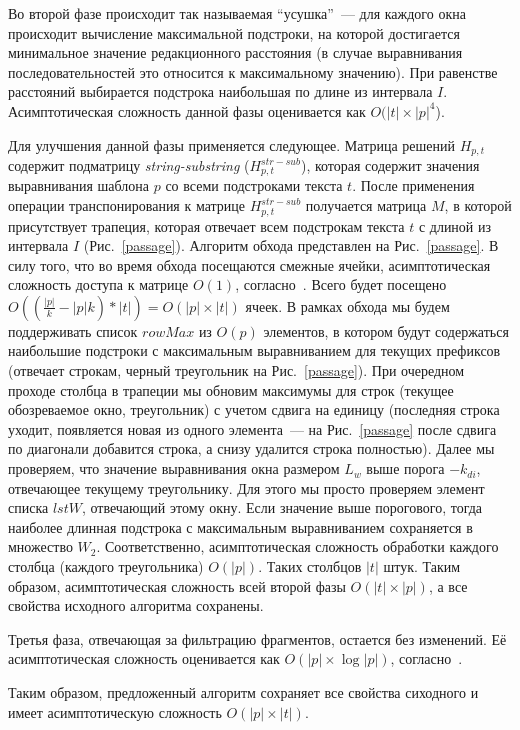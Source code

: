Во второй фазе происходит так называемая ``усушка''~--- для каждого окна происходит вычисление максимальной подстроки, на которой достигается минимальное значение редакционного расстояния (в случае выравнивания последовательностей это относится к максимальному значению).
При равенстве расстояний выбирается подстрока наибольшая по длине из интервала $I$.
Асимптотическая сложность данной фазы оценивается как $O(|t| \times |p|^4$).

Для улучшения данной фазы применяется следующее.
Матрица решений $H_{p,t}$ содержит подматрицу \emph{string-substring} ($H^{str-sub}_{p,t}$), которая содержит значения выравнивания шаблона $p$ со всеми подстроками текста $t$.
После применения операции транспонирования к матрице $H^{str-sub}_{p,t}$ получается матрица $M$, в которой присутствует трапеция, которая отвечает всем подстрокам текста $t$ с длиной из интервала $I$ (Рис.~\ref{passage}).
Алгоритм обхода представлен на Рис.~\ref{passage}.
В силу того, что во время обхода посещаются смежные ячейки, асимптотическая сложность доступа к матрице $O(1)$, согласно~\cite{tiskin2008semi}.
Всего будет посещено $O((\frac{|p|}{k}-|p|k)*|t|)=O(|p|\times|t|)$ ячеек.
В рамках обхода мы будем поддерживать список $rowMax$ из $O(p)$ элементов, в котором будут содержаться наибольшие подстроки с максимальным выравниванием для текущих префиксов (отвечает строкам, черный треугольник на Рис.~\ref{passage}).
При очередном проходе столбца в трапеции мы обновим максимумы для строк (текущее обозреваемое окно, треугольник) с учетом сдвига на единицу (последняя строка уходит, появляется новая из одного элемента~--- на Рис.~\ref{passage} после сдвига по диагонали добавится строка, а снизу удалится строка полностью).
Далее мы проверяем, что значение выравнивания окна размером $L_{w}$ выше порога $-k_{di}$, отвечающее текущему треугольнику.
Для этого мы просто проверяем элемент списка $lstW$, отвечающий этому окну.
Если значение выше порогового, тогда наиболее длинная подстрока с максимальным выравниванием сохраняется в множество $W_{2}$.
Соответственно, асимптотическая сложность обработки каждого столбца (каждого треугольника) $O(|p|)$.
Таких столбцов $|t|$ штук.
Таким образом, асимптотическая сложность всей второй фазы $O(|t| \times |p|)$, а все свойства исходного алгоритма сохранены.

Третья фаза, отвечающая за фильтрацию фрагментов, остается без изменений.
Её асимптотическая сложность оценивается как $O(|p| \times \log |p|)$, согласно~\cite{luciv2019interactive}.

Таким образом, предложенный алгоритм сохраняет все свойства сиходного и имеет асимптотическую сложность $O(|p| \times |t|)$.


